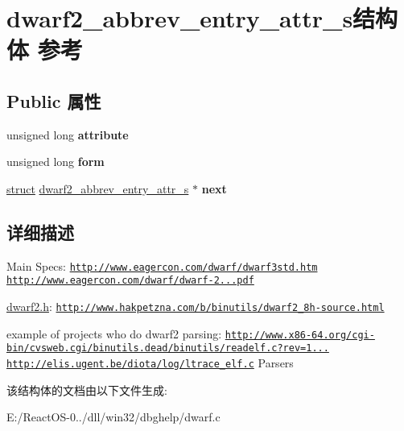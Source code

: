 \hypertarget{structdwarf2__abbrev__entry__attr__s}{}\section{dwarf2\+\_\+abbrev\+\_\+entry\+\_\+attr\+\_\+s结构体 参考}
\label{structdwarf2__abbrev__entry__attr__s}
\subsection*{Public 属性}
\begin{DoxyCompactItemize}
\item 
\mbox{\label{structdwarf2__abbrev__entry__attr__s_a2558268b43e18e5ecb6b93f7117e7a4f}} 
unsigned long {\bfseries attribute}
\item 
\mbox{\label{structdwarf2__abbrev__entry__attr__s_aaa1f05f6711dcbda615fc8528ffb32bf}} 
unsigned long {\bfseries form}
\item 
\mbox{\label{structdwarf2__abbrev__entry__attr__s_a09f54b5819355a0fdd25ee1c060d4d7d}} 
\hyperlink{interfacestruct}{struct} \hyperlink{structdwarf2__abbrev__entry__attr__s}{dwarf2\+\_\+abbrev\+\_\+entry\+\_\+attr\+\_\+s} $\ast$ {\bfseries next}
\end{DoxyCompactItemize}


\subsection{详细描述}
Main Specs\+: \href{http://www.eagercon.com/dwarf/dwarf3std.htm}{\tt http\+://www.\+eagercon.\+com/dwarf/dwarf3std.\+htm} \href{http://www.eagercon.com/dwarf/dwarf-2.0.0.pdf}{\tt http\+://www.\+eagercon.\+com/dwarf/dwarf-\/2...\+pdf}

\hyperlink{dwarf2_8h_source}{dwarf2.\+h}\+: \href{http://www.hakpetzna.com/b/binutils/dwarf2_8h-source.html}{\tt http\+://www.\+hakpetzna.\+com/b/binutils/dwarf2\+\_\+8h-\/source.\+html}

example of projects who do dwarf2 parsing\+: \href{http://www.x86-64.org/cgi-bin/cvsweb.cgi/binutils.dead/binutils/readelf.c?rev=1.1.1.2}{\tt http\+://www.\+x86-\/64.\+org/cgi-\/bin/cvsweb.\+cgi/binutils.\+dead/binutils/readelf.\+c?rev=1...} \href{http://elis.ugent.be/diota/log/ltrace_elf.c}{\tt http\+://elis.\+ugent.\+be/diota/log/ltrace\+\_\+elf.\+c} Parsers 

该结构体的文档由以下文件生成\+:\begin{DoxyCompactItemize}
\item 
E\+:/\+React\+O\+S-\/0../dll/win32/dbghelp/dwarf.\+c\end{DoxyCompactItemize}
